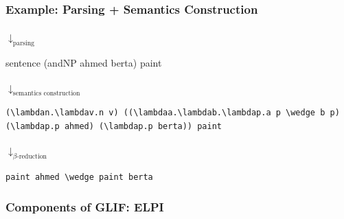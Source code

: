 \begin{frame}[fragile]
    \frametitle{Example: Parsing + Semantics Construction}
    {\centering{}\par}\vspace{1em}
    \hspace{0.49\textwidth}$\downarrow_{\text{parsing}}$\par\vspace{1em}
    {\centering\color{logicfont!50!nlfont} sentence (andNP ahmed berta) paint\par}\vspace{1em}
    \hspace{0.49\textwidth}$\downarrow_{\text{semantics construction}}$\par\vspace{1em}
    {\centering\begin{adjustbox}{}\color{logicfont}\footnotesize\lstinline[language=MMT]|(\lambdan.\lambdav.n v) ((\lambdaa.\lambdab.\lambdap.a p \wedge b p) (\lambdap.p ahmed) (\lambdap.p berta)) paint|\end{adjustbox}\par}\vspace{1em}
    \hspace{0.49\textwidth}$\downarrow_{\text{$\beta$-reduction}}$\par\vspace{1em}
    {\centering\color{logicfont}\small\begin{adjustbox}{}\lstinline[language=MMT]|paint ahmed \wedge paint berta|\end{adjustbox}\par}
\end{frame}

\begin{frame}
    \frametitle{Components of GLIF: ELPI}
    
\end{frame}

